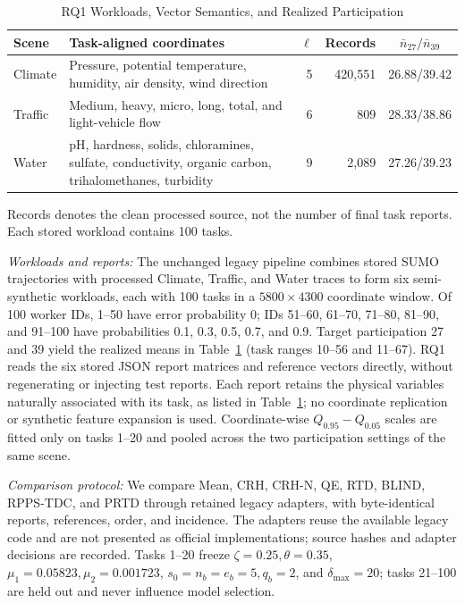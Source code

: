 \documentclass[journal]{IEEEtran}
\begin{document}
\begin{table}[!b]
\centering
\caption{RQ1 Workloads, Vector Semantics, and Realized Participation}
\label{tab:workload-representation}
\scriptsize
\setlength{\tabcolsep}{1.2pt}
\renewcommand{\arraystretch}{1.05}
\begin{tabularx}{\columnwidth}{@{}lXrrc@{}}
\toprule
\textbf{Scene} & \textbf{Task-aligned coordinates} & \(\boldsymbol\ell\) & \textbf{Records} & \(\bar n_{27}/\bar n_{39}\) \\
\midrule
Climate & Pressure, potential temperature, humidity, air density, wind direction & 5 & 420,551 & 26.88/39.42 \\
Traffic & Medium, heavy, micro, long, total, and light-vehicle flow & 6 & 809 & 28.33/38.86 \\
Water & pH, hardness, solids, chloramines, sulfate, conductivity, organic carbon, trihalomethanes, turbidity & 9 & 2,089 & 27.26/39.23 \\
\bottomrule
\end{tabularx}
\vspace{0.2ex}
\parbox{0.98\columnwidth}{\scriptsize Records denotes the clean processed source, not the number of final task reports. Each stored workload contains 100 tasks.}
\end{table}

\textit{Workloads and reports:}
The unchanged legacy pipeline combines stored SUMO trajectories with processed
Climate, Traffic, and Water traces to form six semi-synthetic workloads, each
with 100 tasks in a \(5800\times4300\) coordinate window. Of 100 worker IDs,
1--50 have error probability 0; IDs 51--60, 61--70, 71--80, 81--90, and
91--100 have probabilities 0.1, 0.3, 0.5, 0.7, and 0.9. Target participation
27 and 39 yield the realized means in Table~\ref{tab:workload-representation}
(task ranges 10--56 and 11--67). RQ1 reads the six stored JSON report matrices and
reference vectors directly, without regenerating or injecting test reports.
Each report retains the physical variables naturally associated with its task,
as listed in Table~\ref{tab:workload-representation}; no coordinate replication
or synthetic feature expansion is used. Coordinate-wise
\(Q_{0.95}-Q_{0.05}\) scales are fitted only on tasks 1--20 and pooled across
the two participation settings of the same scene.

\textit{Comparison protocol:}
We compare Mean, CRH, CRH-N, QE, RTD, BLIND, RPPS-TDC, and PRTD through retained
legacy adapters, with byte-identical reports, references, order, and incidence.
The adapters reuse the available legacy code and are not presented as official
implementations; source hashes and adapter decisions are recorded.
Tasks 1--20 freeze \(\zeta=0.25,\theta=0.35\),
\(\mu_1=0.05823,\mu_2=0.001723\), \(s_0=n_b=e_b=5,q_b=2\), and
\(\delta_{\max}=20\); tasks 21--100 are held out and never influence model
selection.
\end{document}
